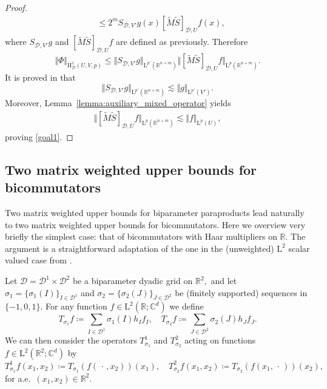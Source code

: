 \documentclass{article}
\theoremstyle{definition}
\theoremstyle{remark}
\numberwithin{equation}{section}
\newcommand{\cD}{\mathcal{D}}
\newcommand{\bfD}{\bm{\mathcal{D}}}
\newcommand{\reals}{\mathbb{R}}
\newcommand{\complex}{\mathbb{C}}
\newcommand{\Lp}[1]{\mathrm{L}^{#1}}
\newcommand{\1}{\mathbf{1}}
\newcommand{\var}{\,\cdot\,}
\begin{document}
\begin{proof}
\begin{align*}
            &\leq 2^m S_{\bfD,V'}g(x)[\widetilde{M}\widetilde{S}]_{\bfD,U}f(x),
        \end{align*}
        where $S_{\bfD,V'}g$ and $[\widetilde{M}\widetilde{S}]_{\bfD,U}f$ are defined as previously.
        Therefore
        \begin{equation*}
            \Vert\Phi\Vert_{\mathrm{H}^1_{\bfD}(U,V,p)}\leq\Vert S_{\bfD,V'}g\Vert_{\Lp{p'}(\reals^{n+m})}\Vert[\widetilde{M}\widetilde{S}]_{\bfD,U}f\Vert_{\Lp{p}(\reals^{n+m})}.
        \end{equation*}
        It is proved in \cite[Lemmas 5.2]{DKPS2024} that
        \begin{equation*}
           \Vert S_{\bfD,V'}g\Vert_{\Lp{p'}(\reals^{n+m})}\lesssim\Vert g\Vert_{\Lp{p'}(V')}.
        \end{equation*}
        Moreover, Lemma~\ref{lemma:auxiliary_mixed_operator} yields
        \begin{align*}
            \Vert[\widetilde{M}\widetilde{S}]_{\bfD,U}f\Vert_{\Lp{p}(\reals^{n+m})}
            \lesssim\Vert f\Vert_{\Lp{p}(U)},
        \end{align*}
        proving \eqref{goal1}.
    \end{proof}

    \subsection{Two matrix weighted upper bounds for bicommutators}
    \label{subsec:bicommutators}

    Two matrix weighted upper bounds for biparameter paraproducts lead naturally to two matrix weighted upper bounds for bicommutators. Here we overview very briefly the simplest case: that of bicommutators with Haar multipliers on $\reals.$ The argument is a straightforward adaptation of the one in the (unweighted) $\Lp{2}$ scalar valued case from \cite{Blasco_Pott_2005}.
    
    Let $\bfD=\cD^1\times\cD^2$ be a biparameter dyadic grid on $\reals^2,$ and let $\sigma_1=\{\sigma_1(I)\}_{I\in\cD^1}$ and $\sigma_2=\{\sigma_2(J)\}_{J\in\cD^2}$ be (finitely supported) sequences in $\{-1,0,1\}.$ For any function $f\in \Lp{2}(\reals;\complex^d)$ we define
    \begin{equation*}
        T_{\sigma_1}f \coloneq  \sum_{I\in\cD^1}\sigma_1(I)h_{I}f_{I},\quad T_{\sigma_2}f \coloneq  \sum_{J\in\cD^2}\sigma_2(J)h_{J}f_{J}.
    \end{equation*}
    We can then consider the operators $T^1_{\sigma_1}$ and $T^2_{\sigma_2}$ acting on functions $f\in \Lp{2}(\reals^2;\complex^d)$ by
    \begin{equation*}
        T^1_{\sigma_1}f(x_1,x_2) \coloneq  T_{\sigma_1}(f(\var,x_2))(x_1),\quad T^2_{\sigma_2}f(x_1,x_2) \coloneq  T_{\sigma_2}(f(x_1,\var))(x_2),
    \end{equation*}
    for a.e.~$(x_1,x_2)\in\reals^2.$
\end{document}
